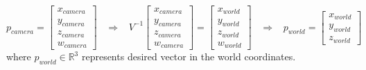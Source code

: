 \documentclass{report}
\begin{document}
\begin{equation} \label{eq:to_world}
p_{camera} = \begin{bmatrix}
           x_{camera}\\
           y_{camera} \\
           z_{camera} \\
           w_{camera}
\end{bmatrix} \; \; \; \Rightarrow \; \; \; 
V^{-1}\begin{bmatrix}
           x_{camera}\\
           y_{camera} \\
           z_{camera} \\
           w_{camera}
\end{bmatrix} = \begin{bmatrix}
           x_{world}\\
           y_{world} \\
           z_{world} \\
           w_{world}
\end{bmatrix}  \; \; \; \Rightarrow \; \; \; 
p_{world} = \begin{bmatrix}
           x_{world}\\
           y_{world} \\
           z_{world}
\end{bmatrix}
\end{equation}
where $p_{world} \in \mathbb{R}^{3}$ represents desired vector in the world coordinates.
\end{document}

